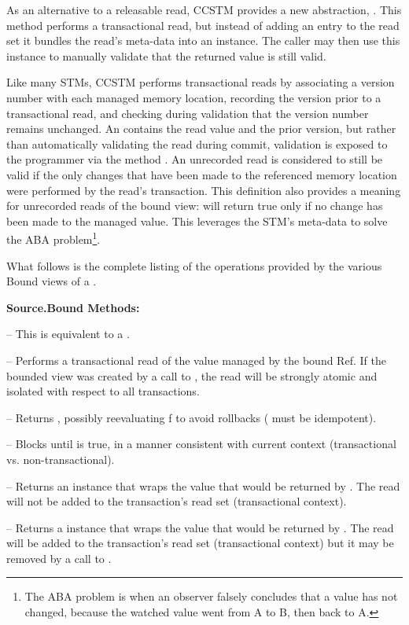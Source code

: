 As an alternative to a releasable read, CCSTM provides a new
abstraction, .  This method performs a
transactional read, but instead of adding an entry to the read set it
bundles the read's meta-data into an  instance.
The caller may then use this instance to manually validate that the
returned value is still valid.

Like many STMs, CCSTM performs transactional reads by associating a
version number with each managed memory location, recording the version
prior to a transactional read, and checking during validation that the
version number remains unchanged.  An  contains the
read value and the prior version, but rather than automatically validating
the read during commit, validation is exposed to the programmer via the
method .  An unrecorded read is considered to still be
valid if the only changes that have been made to the referenced memory
location were performed by the read's transaction.  This definition also
provides a meaning for unrecorded reads of the  bound view:
 will return true only if no change has been made to the
managed value.  This leverages the STM's meta-data to solve
the ABA problem\footnote{The ABA problem is when an observer falsely
concludes that a value has not changed, because the watched value went
from A to B, then back to A.}.

What follows is the complete listing of the operations provided by the various
Bound views of a .

\textbf{Source.Bound Methods:}
\begin{packed_itemize}
\item {} -- This is equivalent to a .
\item {} -- Performs a transactional read of the value 
managed by the bound Ref. If the bounded view was created by a call to , the read will
be strongly atomic and isolated with respect to all transactions.
\item {} -- Returns , possibly 
reevaluating f to avoid rollbacks ( must be idempotent).
\item {} -- Blocks until  is true, in a 
manner consistent with current context (transactional vs. non-transactional).
\item {} -- Returns an  instance that 
wraps the value that would be returned by . The read will not be added to the transaction's read set (transactional context).
\item {} -- Returns a  instance that 
wraps the value that would be returned by . The read will be added to the transaction's read set (transactional context) but it may be removed by a call to 
.
\end{packed_itemize}

